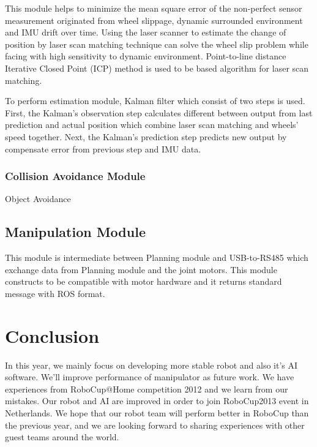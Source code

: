 \documentclass{llncs}
\begin{document}
This module helps to minimize the mean square error of the non-perfect sensor measurement originated from wheel slippage, dynamic surrounded environment and IMU drift over time. Using the laser scanner to estimate the change of position by laser scan matching technique can solve the wheel slip problem while facing with high sensitivity to dynamic environment. Point-to-line distance Iterative Closed Point (ICP)\cite{icp1}\cite{icp2} method is used to be based algorithm for laser scan matching.

To perform estimation module, Kalman filter which consist of two steps is used. First, the Kalman's observation step calculates different between output from last prediction and actual position which combine laser scan matching and wheels' speed together. Next, the Kalman's prediction step predicts new output by compensate error from previous step and IMU data.

\subsubsection{Collision Avoidance Module}

Object Avoidance

\subsection{Manipulation Module}

This module is intermediate between Planning module and USB-to-RS485 which exchange data from Planning module and the joint motors. This module constructs to be compatible with motor hardware and it returns standard message with ROS format.

\section{Conclusion}

In this year, we mainly focus on developing more stable robot and also it's AI software. We'll improve performance of manipulator as future work. We have experiences from RoboCup@Home competition 2012 and we learn from our mistakes. Our robot and AI are improved in order to join RoboCup2013 event in Netherlands. We hope that our robot team will perform better in RoboCup than the previous year, and we are looking forward to sharing experiences with other guest teams around the world.
\end{document}
